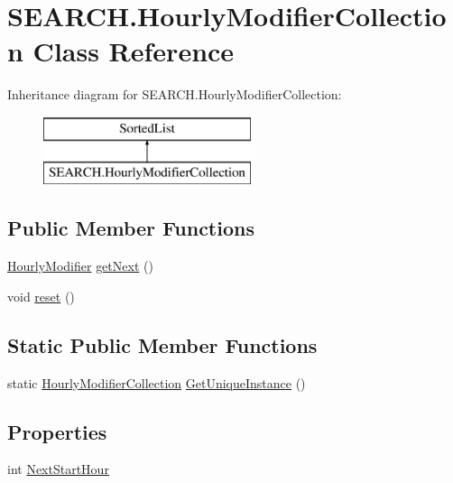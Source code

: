 \hypertarget{class_s_e_a_r_c_h_1_1_hourly_modifier_collection}{\section{S\-E\-A\-R\-C\-H.\-Hourly\-Modifier\-Collection Class Reference}
\label{class_s_e_a_r_c_h_1_1_hourly_modifier_collection}
}
Inheritance diagram for S\-E\-A\-R\-C\-H.\-Hourly\-Modifier\-Collection\-:\begin{figure}[H]
\begin{center}
\leavevmode
\includegraphics[height=2.000000cm]{class_s_e_a_r_c_h_1_1_hourly_modifier_collection}
\end{center}
\end{figure}
\subsection*{Public Member Functions}
\begin{DoxyCompactItemize}
\item 
\hyperlink{class_s_e_a_r_c_h_1_1_hourly_modifier}{Hourly\-Modifier} \hyperlink{class_s_e_a_r_c_h_1_1_hourly_modifier_collection_a51653c14e4d2f9a12f8eb252a93e5f09}{get\-Next} ()
\item 
void \hyperlink{class_s_e_a_r_c_h_1_1_hourly_modifier_collection_a3930bf2ae52037842365f412ddadec27}{reset} ()
\end{DoxyCompactItemize}
\subsection*{Static Public Member Functions}
\begin{DoxyCompactItemize}
\item 
static \hyperlink{class_s_e_a_r_c_h_1_1_hourly_modifier_collection}{Hourly\-Modifier\-Collection} \hyperlink{class_s_e_a_r_c_h_1_1_hourly_modifier_collection_a0454748be6b9c7508e81c16fa0db4c59}{Get\-Unique\-Instance} ()
\end{DoxyCompactItemize}
\subsection*{Properties}
\begin{DoxyCompactItemize}
\item 
int \hyperlink{class_s_e_a_r_c_h_1_1_hourly_modifier_collection_a6833cba60a501f4c5e22fd78636c6ade}{Next\-Start\-Hour}
\end{DoxyCompactItemize}


